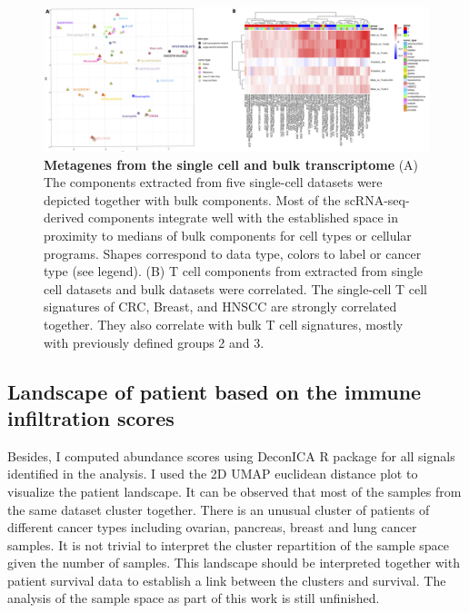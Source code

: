 \documentclass[12pt,]{book}
\theoremstyle{definition}
\theoremstyle{definition}
\theoremstyle{definition}
\theoremstyle{remark}
\begin{document}
\begin{figure}

{\centering \includegraphics[width=7.5in,angle=90]{figures-ext/corr_sc_tcell_plot} 

}

\caption[Metagenes from single cell and bulk transcriptome]{\textbf{Metagenes from the single cell and bulk
transcriptome} (A) The components extracted from five single-cell
datasets were depicted together with bulk components. Most of the
scRNA-seq-derived components integrate well with the established space
in proximity to medians of bulk components for cell types or cellular
programs. Shapes correspond to data type, colors to label or cancer type
(see legend). (B) T cell components from extracted from single cell
datasets and bulk datasets were correlated. The single-cell T cell
signatures of CRC, Breast, and HNSCC are strongly correlated together.
They also correlate with bulk T cell signatures, mostly with previously
defined groups 2 and 3.}\label{fig:scbulk}
\end{figure}













\hypertarget{landscape-of-patient-based-on-the-immune-infiltration-scores}{%
\subsection{Landscape of patient based on the immune infiltration
scores}\label{landscape-of-patient-based-on-the-immune-infiltration-scores}}

Besides, I computed abundance scores using DeconICA R package for all
signals identified in the analysis. I used the 2D UMAP euclidean
distance plot to visualize the patient landscape. It can be observed
that most of the samples from the same dataset cluster together. There
is an unusual cluster of patients of different cancer types including
ovarian, pancreas, breast and lung cancer samples. It is not trivial to
interpret the cluster repartition of the sample space given the number
of samples. This landscape should be interpreted together with patient
survival data to establish a link between the clusters and survival. The
analysis of the sample space as part of this work is still unfinished.
\end{document}
